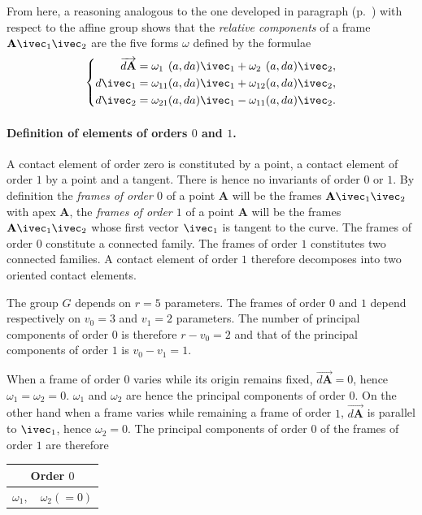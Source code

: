 From here, a reasoning analogous to the one developed in paragraph  (p.~\pageref{sec:72}) with respect to the affine group shows that the \emph{relative components} of a frame $\mathbf{A}\ivec_{1}\ivec_{2}$ are the five forms $\omega$ defined by the formulae
\begin{equation}
  \label{eq:10.2.3}
  \left\{
    \begin{aligned}
      \overrightarrow{d\mathbf{A}}&=\omega_{1\hphantom{0}}(a,da)\ivec_{1}+\omega_{2\hphantom{0}}(a,da)\ivec_{2},\\
      d\ivec_{1}&=\omega_{11}(a,da)\ivec_{1}+\omega_{12}(a,da)\ivec_{2},\\
      d\ivec_{2}&=\omega_{21}(a,da)\ivec_{1}-\omega_{11}(a,da)\ivec_{2}.
    \end{aligned}
  \right.
\end{equation}

\paragraph{Definition of elements of orders $0$ and $1$.}
\label{sec:134}
A contact element of order zero is constituted by a point, a contact element of order $1$ by a point and a tangent. There is hence no invariants of order $0$ or $1$. By definition the \emph{frames of order $0$} of a point $\mathbf{A}$ will be the frames $\mathbf{A}\ivec_{1}\ivec_{2}$ with apex $\mathbf{A}$, the \emph{frames of order $1$} of a point $\mathbf{A}$ will be the frames $\mathbf{A}\ivec_{1}\ivec_{2}$ whose first vector $\ivec_{1}$ is tangent to the curve. The frames of order $0$ constitute a connected family. The frames of order $1$ constitutes two connected families. A contact element of order $1$ therefore decomposes into two oriented contact elements.

The group $G$ depends on $r=5$ parameters. The frames of order $0$ and $1$ depend respectively on $v_{0}=3$ and $v_{1}=2$ parameters. The number of principal components of order $0$ is therefore $r-v_{0}=2$ and that of the principal components of order $1$ is $v_{0}-v_{1}=1$.

When a frame of order $0$ varies while its origin remains fixed, $\overrightarrow{d\mathbf{A}}=0$, hence $\omega_{1}=\omega_{2}=0$. $\omega_{1}$ and $\omega_{2}$ are hence the principal components of order $0$. On the other hand when a frame varies while remaining a frame of order $1$, $\overrightarrow{d\mathbf{A}}$ is parallel to $\ivec_{1}$, hence $\omega_{2}=0$. The principal components of order $0$ of the frames of order $1$ are therefore
\begin{center}  
\begin{tabular}{|c|}
  \hline
  Order $0$\\
  \hline
  $\omega_{1},\quad\omega_{2}(=0)$\\
  \hline
\end{tabular}
\end{center}



